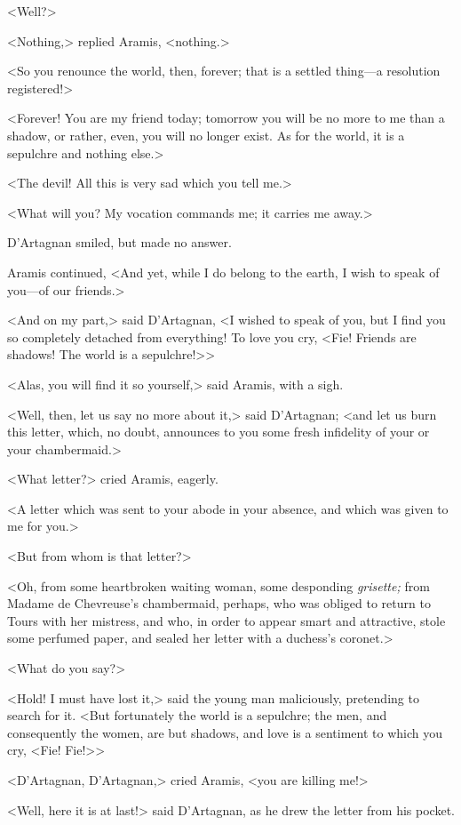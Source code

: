 <Well?> 

<Nothing,> replied Aramis, <nothing.> 

<So you renounce the world, then, forever; that is a settled thing—a resolution registered!> 

<Forever! You are my friend today; tomorrow you will be no more to me than a shadow, or rather, even, you will no longer exist. As for the world, it is a sepulchre and nothing else.> 

<The devil! All this is very sad which you tell me.> 

<What will you? My vocation commands me; it carries me away.> 

D'Artagnan smiled, but made no answer. 

Aramis continued, <And yet, while I do belong to the earth, I wish to speak of you—of our friends.> 

<And on my part,> said D'Artagnan, <I wished to speak of you, but I find you so completely detached from everything! To love you cry, <Fie! Friends are shadows! The world is a sepulchre!>> 

<Alas, you will find it so yourself,> said Aramis, with a sigh. 

<Well, then, let us say no more about it,> said D'Artagnan; <and let us burn this letter, which, no doubt, announces to you some fresh infidelity of your  or your chambermaid.> 

<What letter?> cried Aramis, eagerly. 

<A letter which was sent to your abode in your absence, and which was given to me for you.> 

<But from whom is that letter?> 

<Oh, from some heartbroken waiting woman, some desponding \textit{grisette;} from Madame de Chevreuse's chambermaid, perhaps, who was obliged to return to Tours with her mistress, and who, in order to appear smart and attractive, stole some perfumed paper, and sealed her letter with a duchess's coronet.> 

<What do you say?> 

<Hold! I must have lost it,> said the young man maliciously, pretending to search for it. <But fortunately the world is a sepulchre; the men, and consequently the women, are but shadows, and love is a sentiment to which you cry, <Fie! Fie!>> 

<D'Artagnan, D'Artagnan,> cried Aramis, <you are killing me!> 

<Well, here it is at last!> said D'Artagnan, as he drew the letter from his pocket. 


